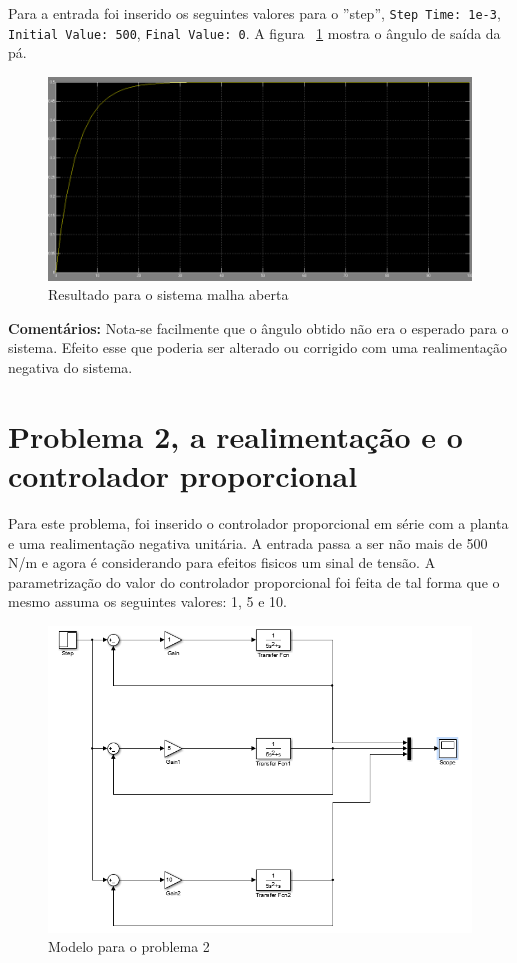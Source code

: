 \documentclass[a4paper, 10pt]{article}
\begin{document}
Para a entrada foi inserido os seguintes valores para o ''step'', \texttt{Step Time: 1e-3}, \texttt{Initial Value: 500}, \texttt{Final Value: 0}. A figura 
~\ref{fig:resultadoMalhaAberta} mostra o ângulo de saída da pá.

\begin{figure}[!ht]
	\centering
	\includegraphics[scale=.3]{rq1.png}
    \caption{Resultado para o sistema malha aberta}
    \label{fig:resultadoMalhaAberta}
\end{figure}

\textbf{Comentários:} Nota-se facilmente que o ângulo obtido não era o esperado para o sistema. Efeito esse que poderia ser alterado ou corrigido com uma realimentação negativa do sistema. 

\section{Problema 2, a realimentação e o controlador proporcional}

Para este problema, foi inserido o controlador proporcional em série com a planta e uma realimentação negativa unitária. A entrada passa a ser não mais 
de 500 N/m e agora é considerando para efeitos fisicos um sinal de tensão.
A parametrização do valor do controlador proporcional foi feita de tal forma que o mesmo assuma os seguintes valores: 1, 5 e 10.

\begin{figure}[!ht]
	\centering
	\includegraphics[scale=.6]{sq2.png}
    \caption{Modelo para o problema 2}
    \label{fig:modeloProblema2}
\end{figure}
\end{document}
